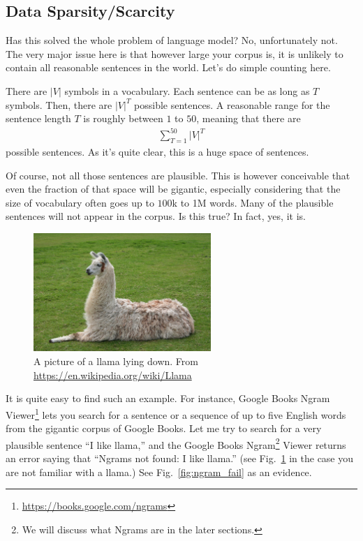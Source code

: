 \documentclass{report}
\begin{document}
\subsection{Data Sparsity/Scarcity}
\label{sec:data_sparsity}

Has this solved the whole problem of language model? No, unfortunately not. The
very major issue here is that however large your corpus is, it is unlikely to
contain all reasonable sentences in the world. Let's do simple counting here.

There are $|V|$ symbols in a vocabulary. Each sentence can be as long as $T$
symbols. Then, there are $|V|^T$ possible sentences. A reasonable range for the
sentence length $T$ is roughly between $1$ to $50$, meaning that there are
\begin{align*}
    \sum_{T=1}^{50} |V|^T
\end{align*}
possible sentences. As it's quite clear, this is a huge space of sentences.

Of course, not all those sentences are plausible. This is however conceivable
that even the fraction of that space will be gigantic, especially considering
that the size of vocabulary often goes up to $100$k to 1M words. Many of the
plausible sentences will not appear in the corpus. Is this true? In fact, yes,
it is. 

\begin{figure}[ht]
    \centering
    \includegraphics[width=0.6\textwidth]{figures/llama_lying_down.jpg}
    \caption{A picture of a llama lying down. From
    \url{https://en.wikipedia.org/wiki/Llama}}
    \label{fig:llama}
\end{figure}

It is quite easy to find such an example. For instance, Google Books Ngram
Viewer\footnote{
    \url{https://books.google.com/ngrams}
}
lets you search for a sentence or a sequence of up to five English words from
the gigantic corpus of Google Books. Let me try to search for a very plausible
sentence ``I like llama,'' and the Google Books Ngram\footnote{
    We will discuss what Ngrams are in the later sections.
} 
Viewer returns an error
saying that ``Ngrams not found: I like llama.'' (see Fig.~\ref{fig:llama} in the case you
are not familiar with a llama.) See Fig.~\ref{fig:ngram_fail} as an evidence.
\end{document}
